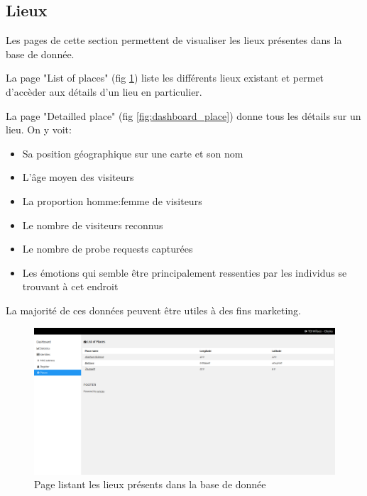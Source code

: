 \subsection{Lieux}
Les pages de cette section permettent de visualiser les lieux présentes dans la base de donnée.

La page "List of places" (fig \ref{fig:dashboard_list_places}) liste les différents lieux existant et permet d'accèder aux détails d'un lieu en particulier.

La page "Detailled place" (fig \ref{fig:dashboard_place}) donne tous les détails sur un lieu. On y voit:
\begin{itemize}
    \item Sa position géographique sur une carte et son nom
    \item L'âge moyen des visiteurs
    \item La proportion homme:femme de visiteurs
    \item Le nombre de visiteurs reconnus
    \item Le nombre de probe requests capturées
    \item Les émotions qui semble être principalement ressenties par les individus se trouvant à cet endroit
\end{itemize}

La majorité de ces données peuvent être utiles à des fins marketing.

\clearpage
\newpage
\thispagestyle{empty}
\begin{landscape}
    \centering
\thispagestyle{empty}
\begin{figure}[H]
	\includegraphics[width=0.95\linewidth]{images/dashboard/places.png}
	\caption{Page listant les lieux présents dans la base de donnée}
	\label{fig:dashboard_list_places}
\end{figure}
\end{landscape}

